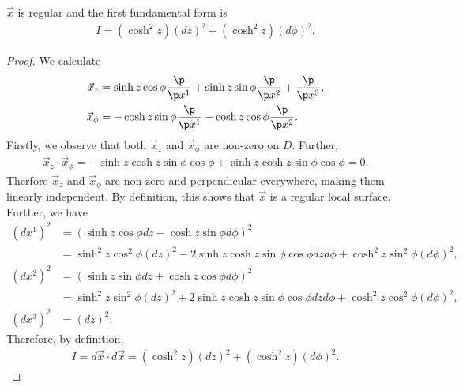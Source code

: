 \documentclass{article}
\begin{document}
\begin{claim*}
   $\vec x$ is regular and the first fundamental form is
   \begin{align*}
      I= (\cosh^2 z)(dz)^2 + (\cosh^2 z) (d\phi)^2.
   \end{align*}
\end{claim*}
\begin{proof}
   We calculate
   \begin{align}
      \label{dirderiv1}
      \vec x_z    & = \sinh z \cos\phi \frac{\p }{\p x^1}
      + \sinh z \sin\phi \frac{\p }{\p x^2}
      + \frac{\p }{\p x^3},                                \\
      \label{dirderiv2}
      \vec x_\phi & = -\cosh z \sin\phi \frac{\p }{\p x^1}
      + \cosh z\cos\phi\frac{\p }{\p x^2}.
   \end{align}
   Firstly, we observe that both $\vec x_z$ and $\vec x_\phi$ are non-zero on $D$.
   Further,
   \begin{align*}
      \vec x_z \cdot \vec x_\phi = -\sinh z\cosh z\sin\phi\cos\phi + \sinh z\cosh z\sin\phi\cos\phi
      = 0.
   \end{align*}
   Therfore $\vec x_z$ and $\vec x_\phi$ are non-zero and perpendicular everywhere, making them linearly
   independent. By definition, this shows that $\vec x$ is a regular local surface.
   Further, we have
   \begin{align*}
      (dx^1)^2 & = (\sinh z\cos\phi dz - \cosh z \sin\phi d\phi)^2                                                     \\
               & =\sinh^2 z \cos^2\phi(dz)^2
      -2\sinh z\cosh z\sin\phi\cos\phi dzd\phi+\cosh^2z\sin^2\phi(d\phi)^2,                                            \\
      (dx^2)^2 & = (\sinh z\sin\phi dz + \cosh z \cos\phi d\phi)^2                                                     \\
               & =\sinh^2 z\sin^2\phi (dz)^2 + 2\sinh z\cosh z\sin\phi\cos\phi dzd\phi + \cosh^2 z\cos^2\phi(d\phi)^2, \\
      (dx^3)^2 & =(dz)^2.
   \end{align*}
   Therefore, by definition,
   \begin{align*}
      I=d\vec x\cdot d\vec x = (\cosh^2 z)(dz)^2 + (\cosh^2 z) (d\phi)^2.
   \end{align*}
\end{proof}
\end{document}
